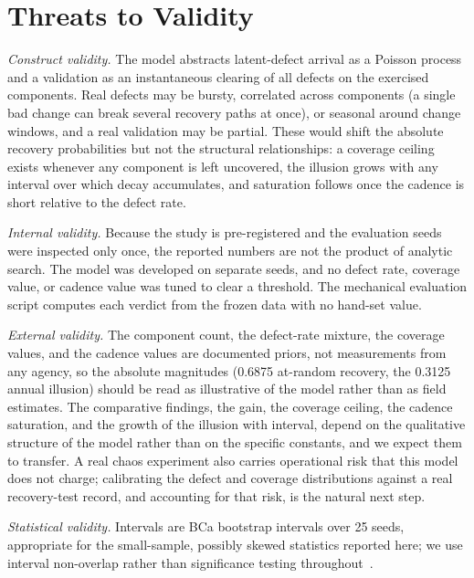 \documentclass[journal]{IEEEtran}
\begin{document}
\section{Threats to Validity}
\emph{Construct validity.} The model abstracts latent-defect arrival as a Poisson process and a
validation as an instantaneous clearing of all defects on the exercised components. Real defects may
be bursty, correlated across components (a single bad change can break several recovery paths at
once), or seasonal around change windows, and a real validation may be partial. These would shift the
absolute recovery probabilities but not the structural relationships: a coverage ceiling exists
whenever any component is left uncovered, the illusion grows with any interval over which decay
accumulates, and saturation follows once the cadence is short relative to the defect rate.

\emph{Internal validity.} Because the study is pre-registered and the evaluation seeds were inspected
only once, the reported numbers are not the product of analytic search. The model was developed on
separate seeds, and no defect rate, coverage value, or cadence value was tuned to clear a threshold.
The mechanical evaluation script computes each verdict from the frozen data with no hand-set value.

\emph{External validity.} The component count, the defect-rate mixture, the coverage values, and the
cadence values are documented priors, not measurements from any agency, so the absolute magnitudes
(0.6875 at-random recovery, the 0.3125 annual illusion) should be read as illustrative of the model
rather than as field estimates. The comparative findings, the gain, the coverage ceiling, the cadence
saturation, and the growth of the illusion with interval, depend on the qualitative structure of the
model rather than on the specific constants, and we expect them to transfer. A real chaos experiment
also carries operational risk that this model does not charge; calibrating the defect and coverage
distributions against a real recovery-test record, and accounting for that risk, is the natural next
step.

\emph{Statistical validity.} Intervals are BCa bootstrap intervals over 25 seeds, appropriate for the
small-sample, possibly skewed statistics reported here; we use interval non-overlap rather than
significance testing throughout~\cite{efron1987bca,efron1994introduction}.
\end{document}
